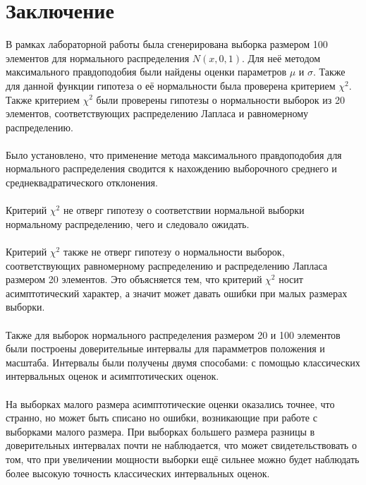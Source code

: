 \documentclass[12pt]{article}
\begin{document}
\section*{Заключение}
В рамках лабораторной работы была сгенерирована выборка размером 100 элементов для нормального распределения $N(x,0,1)$. Для неё методом максимального правдоподобия были найдены оценки параметров $\mu$ и $\sigma$. Также для данной функции гипотеза о её нормальности была проверена критерием $\chi^2$. Также критерием $\chi^2$ были проверены гипотезы о нормальности выборок из 20 элементов, соответствующих распределению Лапласа и равномерному распределению.\\
\phantom{0}\\
Было установлено, что применение метода максимального правдоподобия для нормального распределения сводится к нахождению выборочного среднего и среднеквадратического отклонения.\\
\phantom{0}\\
Критерий $\chi^2$ не отверг гипотезу о соответствии нормальной выборки нормальному распределению, чего и следовало ожидать.\\
\phantom{0}\\
Критерий $\chi^2$ также не отверг гипотезу о нормальности выборок, соответствующих равномерному распределению и распределению Лапласа размером 20 элементов. Это объясняется тем, что критерий $\chi^2$ носит асимптотический характер, а значит может давать ошибки при малых размерах выборки.\\
\phantom{0}\\
Также для выборок нормального распределения размером 20 и 100 элементов были построены доверительные интервалы для парамметров положения и масштаба. Интервалы были получены двумя способами: с помощью классических интервальных оценок и асимптотических оценок.\\
\phantom{0}\\
На выборках малого размера асимптотические оценки оказались точнее, что странно, но может быть списано но ошибки, возникающие при работе с выборками малого размера. При выборках большего размера разницы в доверительных интервалах почти не наблюдается, что может свидетельствовать о том, что при увеличении мощности выборки ещё сильнее можно будет наблюдать более высокую точность классических интервальных оценок.\\
\phantom{0}\\
\end{document}
